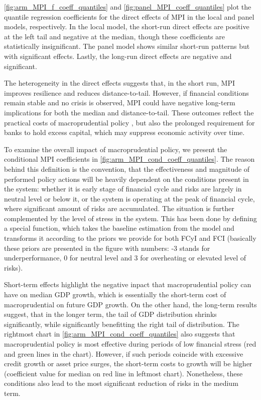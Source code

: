 \autoref{fig:arm_MPI_f_coeff_quantiles} and \autoref{fig:panel_MPI_coeff_quantiles} plot the quantile regression coefficients for the direct effects of MPI in the local and panel models, respectively. In the local model, the short-run direct effects are positive at the left tail and negative at the median, though these coefficients are statistically insignificant. The panel model shows similar short-run patterns but with significant effects. Lastly, the long-run direct effects are negative and significant. 

The heterogeneity in the direct effects suggests that, in the short run, MPI improves resilience and reduces distance-to-tail. However, if financial conditions remain stable and no crisis is observed, MPI could have negative long-term implications for both the median and distance-to-tail. These outcomes reflect the practical costs of macroprudential policy \citep{schmitz2022eu}, but also the prolonged requirement for banks to hold excess capital, which may suppress economic activity over time.

To examine the overall impact of macroprudential policy, we present the conditional MPI coefficients in \autoref{fig:arm_MPI_cond_coeff_quantiles}. The reason behind this definition is the convention, that the effectiveness and magnitude of performed policy actions will be heavily dependent on the conditions present in the system: whether it is early stage of financial cycle and risks are largely in neutral level or below it, or the system is operating at the peak of financial cycle, where significant amount of risks are accumulated. The situation is further complemented by the level of stress in the system. This has been done by defining a special function, which takes the baseline estimation from the model and transforms it according to the priors we provide for both FCyI and FCI (basically these priors are presented in the figure with numbers: -3 stands for underperformance, 0 for neutral level and 3 for overheating or elevated level of risks).

Short-term effects highlight the negative inpact that macroprudential policy can have on median GDP growth, which is essentially the short-term cost of macroprudential on future GDP growth. On the other hand, the long-term results suggest, that in the longer term, the tail of GDP distribution shrinks significantly, while significantly benefitting the right tail of distribution. The rightmost chart in \autoref{fig:arm_MPI_cond_coeff_quantiles} also suggests that macroprudential policy is most effective during periods of low financial stress (red and green lines in the chart). However, if such periods coincide with excessive credit growth or asset price surges, the short-term costs to growth will be higher (coefficient value for median on red line in leftmost chart). Nonetheless, these conditions also lead to the most significant reduction of risks in the medium term.
